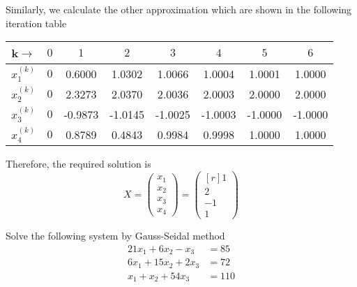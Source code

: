 \documentclass[12pt,class=book,crop=false]{standalone}
\begin{document}
\begin{soln}
        Similarly, we calculate the other approximation which are shown in the following iteration table
        \begin{center}
        \begin{tabular}{cc*{6}{S[table-format=2.4]}}
            \toprule
            k\( \rightarrow \)&\( 0 \)&&&&&&\\\midrule
            \( x_1^{(k)} \)\rule[-1em]{0pt}{1em}&\( 0 \)& 0.6000 & 1.0302 & 1.0066 & 1.0004 & 1.0001 & 1.0000 \\
            \( x_2^{(k)} \)&\rule[-1em]{0pt}{1em}\( 0 \)& 2.3273 & 2.0370 & 2.0036 & 2.0003 & 2.0000 & 2.0000 \\
            \( x_3^{(k)} \)\rule[-1em]{0pt}{1em}&\( 0 \)& -0.9873 & -1.0145 &-1.0025 & -1.0003 & -1.0000 & -1.0000 \\
            \( x_4^{(k)} \)\rule[-1em]{0pt}{1em}&\( 0 \)& 0.8789 & 0.4843 & 0.9984 & 0.9998 & 1.0000 & 1.0000 \\\bottomrule
        \end{tabular}
    \end{center}
        Therefore, the required solution is 
        \[
            X=\begin{pmatrix}
                x_1\\
                x_2\\
                x_3\\
                x_4
            \end{pmatrix}=\begin{pmatrix*}[r]
                1\\
                2\\
                -1\\
                1
            \end{pmatrix*}
        \]
    \end{soln}
    \begin{prob}
        Solve the following system by Gauss-Seidal method
        \begin{align*}
            21x_1+6x_2-x_3&=85\\
            6x_1+15x_2+2x_3&=72\\
            x_1+x_2+54x_3&=110
        \end{align*}
    \end{prob}
\end{document}
